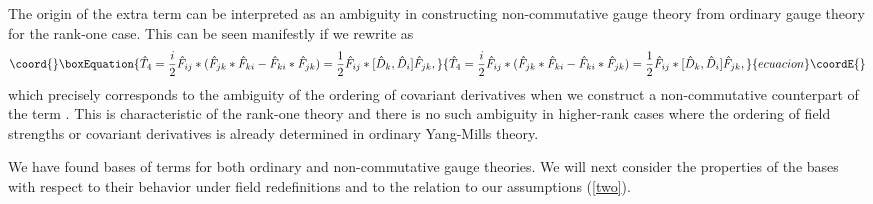 \documentclass[a4paper,12pt]{article}
\begin{document}
The origin of the extra term \coordHE{} can be interpreted
as an ambiguity in constructing non-commutative gauge theory from
ordinary gauge theory for the rank-one case.
This can be seen manifestly if we rewrite \coordHE{} as
\begin{equation}\coord{}\boxEquation{
\hat{T}_4 = \frac{i}{2} \hat{F}_{ij} \ast
(\hat{F}_{jk} \ast \hat{F}_{ki} - \hat{F}_{ki} \ast \hat{F}_{jk})
= \frac{1}{2} \hat{F}_{ij} \ast [ \hat{D}_k, \hat{D}_i] \hat{F}_{jk},
}{
\hat{T}_4 = \frac{i}{2} \hat{F}_{ij} \ast
(\hat{F}_{jk} \ast \hat{F}_{ki} - \hat{F}_{ki} \ast \hat{F}_{jk})
= \frac{1}{2} \hat{F}_{ij} \ast [ \hat{D}_k, \hat{D}_i] \hat{F}_{jk},
}{ecuacion}\coordE{}\end{equation}
which precisely corresponds to the ambiguity of the ordering
of covariant derivatives when we construct
a non-commutative counterpart of the term
\coordHE{}.
This is characteristic of the rank-one theory and
there is no such ambiguity in higher-rank cases
where the ordering of field strengths or covariant derivatives
is already determined in ordinary Yang-Mills theory.

We have found bases of \coordHE{} terms
for both ordinary and non-commutative gauge theories.
We will next consider the properties of the bases
with respect to their behavior under field redefinitions
and to the relation to our assumptions (\ref{two}).
\end{document}
